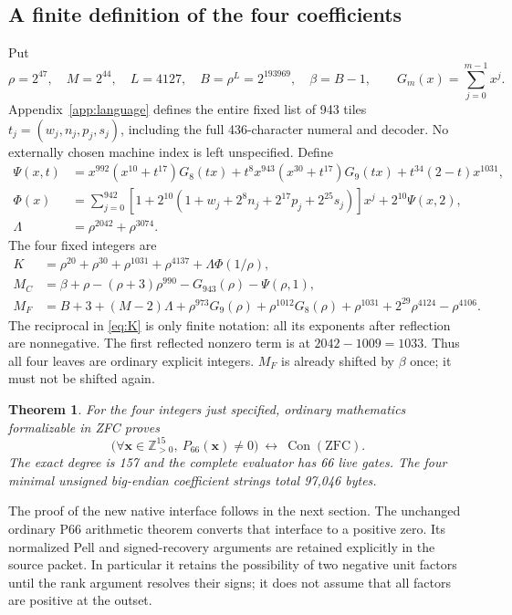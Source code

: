 \documentclass[10pt,letterpaper]{article}
\newcommand{\Pos}{\mathbb Z_{>0}}
\newcommand{\Con}{\operatorname{Con}}
\newtheorem{theorem}{Theorem}[section]
\theoremstyle{remark}\newtheorem{remark}[theorem]{Remark}
\begin{document}
\subsection{A finite definition of the four coefficients}
Put
\[
 \rho=2^{47},\quad M=2^{44},\quad L=4127,\quad
 B=\rho^L=2^{193969},\quad\beta=B-1,
 \qquad G_m(x)=\sum_{j=0}^{m-1}x^j.
\]
Appendix~\ref{app:language} defines the entire fixed list of 943 tiles
$t_j=(w_j,n_j,p_j,s_j)$, including the full 436-character numeral and
decoder. No externally chosen machine index is left unspecified. Define
\begin{align*}
 \Psi(x,t)&=x^{992}(x^{10}+t^{17})G_8(tx)
       +t^8x^{943}(x^{30}+t^{17})G_9(tx)
       +t^{34}(2-t)x^{1031},\\
 \Phi(x)&=\sum_{j=0}^{942}
 [1+2^{10}(1+w_j+2^8n_j+2^{17}p_j+2^{25}s_j)]x^j
       +2^{10}\Psi(x,2),\\
 \Lambda&=\rho^{2042}+\rho^{3074}.
\end{align*}
The four fixed integers are
\begin{align}
 K&=\rho^{20}+\rho^{30}+\rho^{1031}+\rho^{4137}
             +\Lambda\Phi(1/\rho),\label{eq:K}\\
 M_C&=\beta+\rho-(\rho+3)\rho^{990}-G_{943}(\rho)-\Psi(\rho,1),\\
 M_F&=B+3+(M-2)\Lambda+\rho^{973}G_9(\rho)
       +\rho^{1012}G_8(\rho)+\rho^{1031}
       +2^{29}\rho^{4124}-\rho^{4106}.\label{eq:MF}
\end{align}
The reciprocal in \eqref{eq:K} is only finite notation: all its exponents
after reflection are nonnegative. The first reflected nonzero term is at
$2042-1009=1033$. Thus all four leaves are ordinary explicit integers.
$M_F$ is already shifted by $\beta$ once; it must not be shifted again.

\begin{theorem}\label{thm:compact}
For the four integers just specified, ordinary mathematics formalizable in
ZFC proves
\[
 \bigl(\forall\mathbf x\in\Pos^{15},\ P_{66}(\mathbf x)\ne0\bigr)
 \ \longleftrightarrow\ \Con(\mathrm{ZFC}).
\]
The exact degree is 157 and the complete evaluator has 66 live gates.
The four minimal unsigned big-endian coefficient strings total 97,046 bytes.
\end{theorem}

The proof of the new native interface follows in the next section. The
unchanged ordinary P66 arithmetic theorem converts that interface to a
positive zero. Its normalized Pell and signed-recovery arguments are
retained explicitly in the source packet. In particular it retains the
possibility of two negative unit factors until the rank argument resolves
their signs; it does not assume that all factors are positive at the outset.
\end{document}
